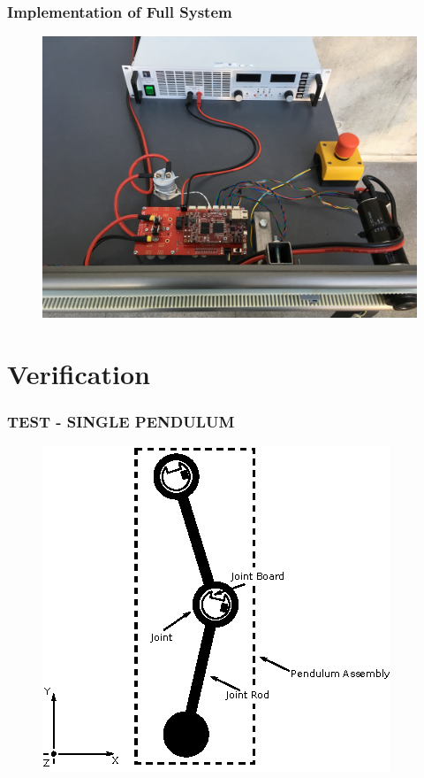 \documentclass[mathserif]{beamer}
\begin{document}
\begin{frame}[c]\frametitle{Implementation of Full System}
	\begin{figure}
		\centering
		\includegraphics[width=.9\linewidth]{graphics/full_system_finish_high}
	\end{figure}
\end{frame}

\section{Verification}



\begin{frame}[c]\frametitle{TEST - SINGLE PENDULUM}
   	\begin{figure}
		\centering
		\includegraphics[width=.7\linewidth]{graphics/joint_assembly.eps}
	\end{figure} 
\end{frame}
\end{document}
